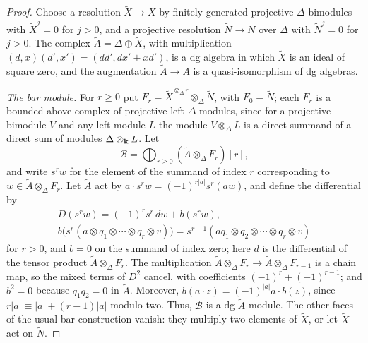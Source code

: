 \begin{proof}
  Choose a resolution ${\widetilde{X}\to X}$ by finitely generated projective
  $\Delta$-bimodules with ${\widetilde{X}^j=0}$ for ${j>0}$, and a projective
  resolution ${\widetilde{N}\to N}$ over $\Delta$ with ${\widetilde{N}^j=0}$ for
  ${j>0}$. The complex ${\widetilde{A}=\Delta\oplus\widetilde{X}}$, with
  multiplication ${(d,x)(d',x')=(dd',dx'+xd')}$, is a dg algebra in which
  $\widetilde{X}$ is an ideal of square zero, and the augmentation
  ${\widetilde{A}\to A}$ is a quasi-isomorphism of dg algebras.

  \emph{The bar module.} For ${r\geq0}$ put
  ${F_r=\widetilde{X}^{\otimes_\Delta r}\otimes_\Delta\widetilde{N}}$, with
  ${F_0=\widetilde{N}}$; each $F_r$ is a bounded-above complex of projective left
  $\Delta$-modules, since for a projective bimodule $V$ and any left module $L$
  the module ${V\otimes_\Delta L}$ is a direct summand of a direct sum of modules
  ${\Delta\otimes_{\mathbf{k}} L}$. Let
  \[
    \mathcal{B}=\bigoplus_{r\geq0}(\widetilde{A}\otimes_\Delta F_r)[r],
  \]
  and write $s^rw$ for the element of the summand of index $r$ corresponding
  to ${w\in\widetilde{A}\otimes_\Delta F_r}$. Let $\widetilde{A}$ act by
  ${a\cdot s^rw=(-1)^{r|a|}s^r(aw)}$, and define the differential by
  \[
    \begin{gathered}
      D(s^rw)=(-1)^rs^r\,dw+b(s^rw),\\
      b\bigl(s^r(a\otimes q_1\otimes\cdots\otimes q_r\otimes v)\bigr)=
      s^{r-1}(aq_1\otimes q_2\otimes\cdots\otimes q_r\otimes v)
    \end{gathered}
  \]
  for ${r>0}$, and ${b=0}$ on the summand of index zero; here $d$ is the
  differential of the tensor product ${\widetilde{A}\otimes_\Delta F_r}$. The
  multiplication ${\widetilde{A}\otimes_\Delta F_r\to\widetilde{A}\otimes_\Delta
  F_{r-1}}$ is a chain map, so the mixed terms of $D^2$ cancel, with
  coefficients ${(-1)^r+(-1)^{r-1}}$; and ${b^2=0}$ because ${q_1q_2=0}$ in
  $\widetilde{A}$. Moreover, ${b(a\cdot z)=(-1)^{|a|}a\cdot b(z)}$, since
  ${r|a|\equiv|a|+(r-1)|a|}$ modulo two. Thus, $\mathcal{B}$ is a dg
  $\widetilde{A}$-module. The other faces of the usual bar construction
  vanish: they multiply two elements of $\widetilde{X}$, or let
  $\widetilde{X}$ act on $\widetilde{N}$.


\end{proof}
